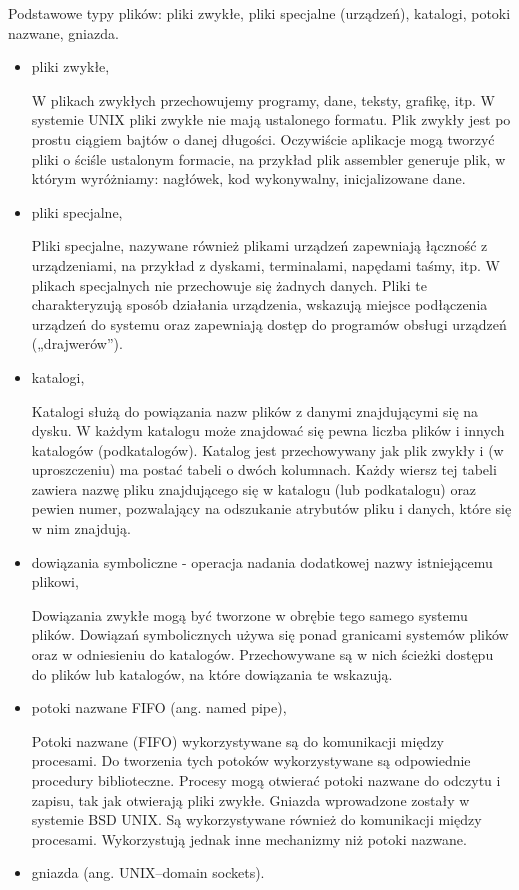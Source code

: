\documentclass[11pt]{article}
\begin{document}
Podstawowe typy plików: pliki zwykłe, pliki specjalne (urządzeń), katalogi, potoki nazwane, gniazda.
\begin{itemize}
    \item pliki zwykłe,

          W plikach zwykłych przechowujemy programy, dane, teksty, grafikę, itp.
          W systemie UNIX pliki zwykłe nie mają ustalonego formatu. Plik zwykły jest po prostu ciągiem bajtów o danej
          długości. Oczywiście aplikacje mogą tworzyć pliki o ściśle ustalonym formacie,
          na przykład plik assembler generuje plik, w którym wyróżniamy: nagłówek, kod wykonywalny, inicjalizowane dane.

    \item pliki specjalne,

          Pliki specjalne, nazywane również plikami urządzeń zapewniają łączność z urządzeniami,
          na przykład z dyskami, terminalami, napędami taśmy, itp. W plikach specjalnych nie
          przechowuje się żadnych danych. Pliki te charakteryzują sposób działania urządzenia,
          wskazują miejsce podłączenia urządzeń do systemu oraz zapewniają dostęp do
          programów obsługi urządzeń („drajwerów”).

    \item katalogi,

          Katalogi służą do powiązania nazw plików z danymi znajdującymi się na dysku. W każdym
          katalogu może znajdować się pewna liczba plików i innych katalogów (podkatalogów).
          Katalog jest przechowywany jak plik zwykły i (w uproszczeniu) ma postać tabeli o dwóch
          kolumnach. Każdy wiersz tej tabeli zawiera nazwę pliku znajdującego się w katalogu (lub
          podkatalogu) oraz pewien numer, pozwalający na odszukanie atrybutów pliku i danych,
          które się w nim znajdują.

    \item dowiązania symboliczne - operacja nadania dodatkowej nazwy istniejącemu plikowi,

          Dowiązania zwykłe mogą być tworzone w obrębie tego samego systemu plików.
          Dowiązań symbolicznych używa się ponad granicami systemów plików oraz w
          odniesieniu do katalogów. Przechowywane są w nich ścieżki dostępu do plików lub
          katalogów, na które dowiązania te wskazują.

    \item potoki nazwane FIFO (ang. named pipe),

          Potoki nazwane (FIFO) wykorzystywane są do komunikacji między procesami.
          Do tworzenia tych potoków wykorzystywane są odpowiednie procedury biblioteczne.
          Procesy mogą otwierać potoki nazwane do odczytu i zapisu, tak jak otwierają pliki zwykłe.
          Gniazda wprowadzone zostały w systemie BSD UNIX. Są wykorzystywane również do
          komunikacji między procesami. Wykorzystują jednak inne mechanizmy niż potoki
          nazwane.

    \item gniazda (ang. UNIX--domain sockets).
\end{itemize}
\end{document}
